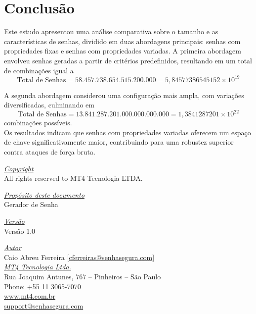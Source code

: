 \section{Conclusão}

Este estudo apresentou uma análise comparativa sobre o tamanho e as características de senhas, dividido em duas abordagens principais: senhas com propriedades fixas e senhas com propriedades variadas. A primeira abordagem envolveu senhas geradas a partir de critérios predefinidos, resultando em um total de combinações igual a 
\[
\text{Total de Senhas} = 58.457.738.654.515.200.000 = 5,84577386545152 \times 10^{19}
\]

A segunda abordagem considerou uma configuração mais ampla, com variações diversificadas, culminando em 
\[
\text{Total de Senhas} = 13.841.287.201.000.000.000.000 = 1,3841287201 \times 10^{22}
\]
combinações possíveis.\\

Os resultados indicam que senhas com propriedades variadas oferecem um espaço de chave significativamente maior, contribuindo para uma robustez superior contra ataques de força bruta.

\pagebreak

\vspace*{\fill}
\begin{flushright}
	\underline{\textit{Copyright}}\\
	All rights reserved to MT4 Tecnologia LTDA.\bigskip

	\underline{\textit{Propósito deste documento}}\\
	Gerador de Senha\bigskip

	\underline{\textit{Versão}}\\
	Versão 1.0\bigskip

	\underline{\textit{Autor}}\\
	Caio Abreu Ferreira [\href{mailto:cferreira@senhasegura.com}{cferreiras@senhasegura.com}] \bigskip\\
	
	\underline{\textit{MT4 Tecnologia Ltda.}}\\
	Rua Joaquim Antunes, 767 – Pinheiros – São Paulo\\
	Phone: +55 11 3065-7070\\
	\url{www.mt4.com.br}\\
	\href{mailto:support@senhasegura.com}{support@senhasegura.com}\\
\end{flushright}
